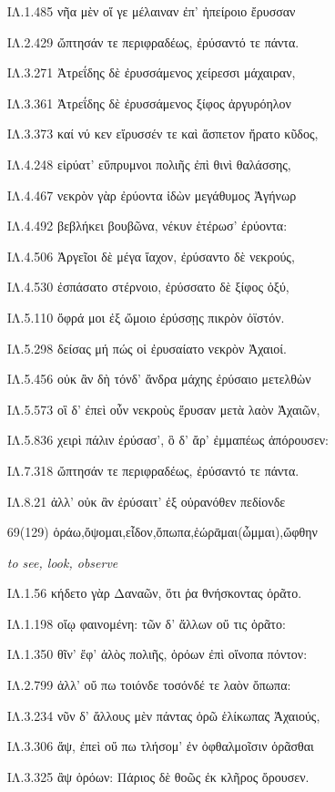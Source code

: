 \begin{enumerate}
{ΙΛ.1.485 νῆα μὲν οἵ γε μέλαιναν ἐπ' ἠπείροιο ἔρυσσαν 

ΙΛ.2.429 ὤπτησάν τε περιφραδέως, ἐρύσαντό τε πάντα. 

ΙΛ.3.271 Ἀτρεΐδης δὲ ἐρυσσάμενος χείρεσσι μάχαιραν, 

ΙΛ.3.361 Ἀτρεΐδης δὲ ἐρυσσάμενος ξίφος ἀργυρόηλον 

ΙΛ.3.373 καί νύ κεν εἴρυσσέν τε καὶ ἄσπετον ἤρατο κῦδος, 

ΙΛ.4.248 εἰρύατ' εὔπρυμνοι πολιῆς ἐπὶ θινὶ θαλάσσης, 

ΙΛ.4.467 νεκρὸν γὰρ ἐρύοντα ἰδὼν μεγάθυμος Ἀγήνωρ 

ΙΛ.4.492 βεβλήκει βουβῶνα, νέκυν ἑτέρωσ' ἐρύοντα: 

ΙΛ.4.506 Ἀργεῖοι δὲ μέγα ἴαχον, ἐρύσαντο δὲ νεκρούς, 

ΙΛ.4.530 ἐσπάσατο στέρνοιο, ἐρύσσατο δὲ ξίφος ὀξύ, 

ΙΛ.5.110 ὄφρά μοι ἐξ ὤμοιο ἐρύσσῃς πικρὸν ὀϊστόν. 

ΙΛ.5.298 δείσας μή πώς οἱ ἐρυσαίατο νεκρὸν Ἀχαιοί. 

ΙΛ.5.456 οὐκ ἂν δὴ τόνδ' ἄνδρα μάχης ἐρύσαιο μετελθὼν 

ΙΛ.5.573 οἳ δ' ἐπεὶ οὖν νεκροὺς ἔρυσαν μετὰ λαὸν Ἀχαιῶν, 

ΙΛ.5.836 χειρὶ πάλιν ἐρύσασ', ὃ δ' ἄρ' ἐμμαπέως ἀπόρουσεν: 

ΙΛ.7.318 ὤπτησάν τε περιφραδέως, ἐρύσαντό τε πάντα. 

ΙΛ.8.21 ἀλλ' οὐκ ἂν ἐρύσαιτ' ἐξ οὐρανόθεν πεδίονδε 

}

\clearpage
\item[\large 69(129)]{\large \g ὁράω,ὄψομαι,εἶδον,ὄπωπα,ἑώρᾱμαι(ὦμμαι),ὤφθην}

\hspace{0.2cm} \textit{ to see, look, observe }

{\g
ΙΛ.1.56 κήδετο γὰρ Δαναῶν, ὅτι ῥα θνήσκοντας ὁρᾶτο. 

ΙΛ.1.198 οἴῳ φαινομένη: τῶν δ' ἄλλων οὔ τις ὁρᾶτο: 

ΙΛ.1.350 θῖν' ἔφ' ἁλὸς πολιῆς, ὁρόων ἐπὶ οἴνοπα πόντον: 

ΙΛ.2.799 ἀλλ' οὔ πω τοιόνδε τοσόνδέ τε λαὸν ὄπωπα: 

ΙΛ.3.234 νῦν δ' ἄλλους μὲν πάντας ὁρῶ ἑλίκωπας Ἀχαιούς, 

ΙΛ.3.306 ἄψ, ἐπεὶ οὔ πω τλήσομ' ἐν ὀφθαλμοῖσιν ὁρᾶσθαι 

ΙΛ.3.325 ἂψ ὁρόων: Πάριος δὲ θοῶς ἐκ κλῆρος ὄρουσεν. 

}
\end{enumerate}
